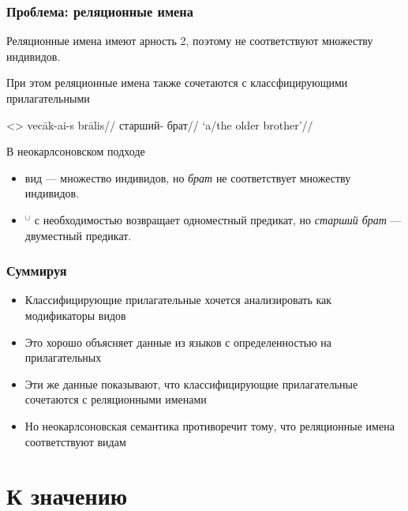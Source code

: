 \documentclass[
    9pt,
]{beamer}
\newcommand{\up}{\ensuremath{{}^\cup}}
\begin{document}
\begin{frame}
    \frametitle{Проблема: реляционные имена}

    Реляционные имена имеют арность 2, поэтому не соответствуют множеству индивидов.
    
    При этом реляционные имена также сочетаются с классфицирующими прилагательными

    \ex<>
        \begingl
            \gla vecāk-ai-s brālis//
            \glb старший-\Def{} брат//
            \glft `a/the older brother'//
        \endgl
    \xe

    В неокарлсоновском подходе
    \begin{itemize}
        \item вид — множество индивидов, но \textit{брат} не соответствует множеству индивидов.
        \item $\up$ с необходимостью возвращает одноместный предикат, но \textit{старший брат} — двуместный предикат.
    \end{itemize}

\end{frame}

\begin{frame}
    \frametitle{Суммируя}

    \begin{itemize}
        \item Классифицирующие прилагательные хочется анализировать как модификаторы видов
        \item Это хорошо объясняет данные из языков с определенностью на прилагательных
        \item Эти же данные показывают, что классифицирующие прилагательные сочетаются с реляционными именами
        \item Но неокарлсоновская семантика противоречит тому, что реляционные имена соответствуют видам
    \end{itemize}

\end{frame}


\section{К значению}
\end{document}
